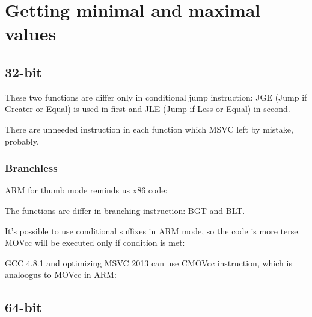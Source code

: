 ﻿\ifx\RUSSIAN\undefined
\section{Getting minimal and maximal values}

\subsection{32-bit}





These two functions are differ only in conditional jump instruction: 
JGE (Jump if Greater or Equal) is used in first
and JLE (Jump if Less or Equal) in second.

\index{\CompilerAnomaly}
\label{MSVC_double_JMP_anomaly}
There are unneeded \JMP instruction in each function which MSVC left by mistake, probably.

\subsubsection{Branchless}

ARM for thumb mode reminds us x86 code:



The functions are differ in branching instruction: BGT and BLT.

It's possible to use conditional suffixes in ARM mode, so the code is more terse.
MOVcc will be executed only if condition is met:



\Optimizing GCC 4.8.1 and optimizing MSVC 2013 can use CMOVcc instruction, which is analoogus to MOVcc in ARM:



\subsection{64-bit}

